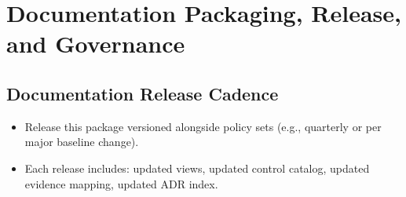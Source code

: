 \documentclass[11pt]{report}
\begin{document}
\section{Documentation Packaging, Release, and Governance}
\subsection{Documentation Release Cadence}
\begin{itemize}
  \item Release this package versioned alongside policy sets (e.g., quarterly or per major baseline change).
  \item Each release includes: updated views, updated control catalog, updated evidence mapping, updated ADR index.
\end{itemize}
\end{document}
